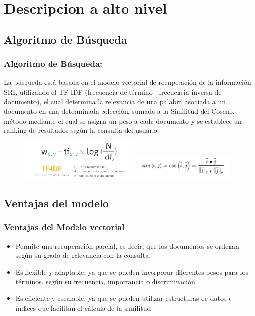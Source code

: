 \section*{Descripcion a alto nivel}



\subsection*{Algoritmo de Búsqueda}

\begin{frame}
    \frametitle{Algoritmo de Búsqueda: }

La búsqueda está basada en el modelo vectorial de recuperación de la información SRI, 
utilizando el TF-IDF (frecuencia de término - frecuencia inversa
 de documento), el cual determina la relevancia de una palabra asociada 
 a un documento en una determinada colección, sumado a la Similitud del Coseno, método mediante el cual se asigna un peso a cada documento y se establece un ranking de resultados según la consulta del usuario.

 \begin{figure}[h]
    \includegraphics[width=60mm]{sections/descarga.png}
    \includegraphics[width=50mm]{sections/descarga (2).png}
 \end{figure}

\end{frame}

 \subsection*{Ventajas del modelo}
 \begin{frame}
    \frametitle{Ventajas del Modelo vectorial}

    \begin{itemize}
         \item Permite una recuperación parcial, es decir, que los documentos se ordenan según su grado de relevancia con la consulta.
\item Es flexible y adaptable, ya que se pueden incorporar diferentes pesos para los términos, según su frecuencia, importancia o discriminación
\item Es eficiente y escalable, ya que se pueden utilizar estructuras de datos e índices que facilitan el cálculo de la similitud
    \end{itemize}


\end{frame}

